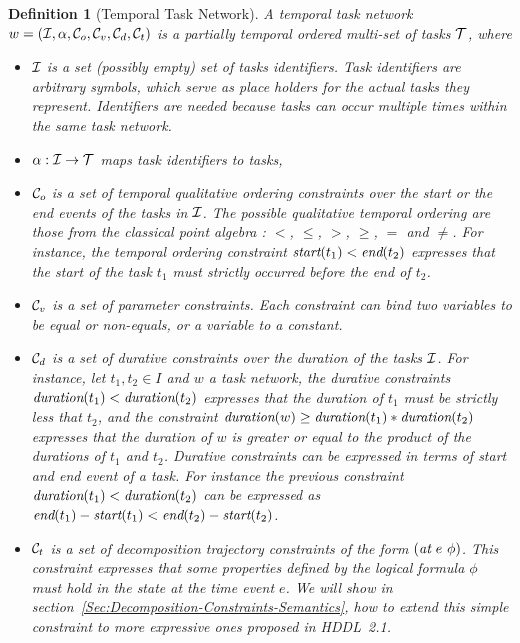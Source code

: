 \documentclass[letterpaper]{article} %
\newtheorem{definition}{Definition}
\newcommand{\at}{\text{\it at}}
\newcommand{\duration}{\text{\it duration}}
\newcommand{\tstart}{\text{\it start}}
\newcommand{\tend}{\text{\it end}}
\begin{document}
 

\begin{definition}[Temporal Task Network]
A temporal task network $w = ({\cal{I}}, \alpha, {\cal{C}}_o, {\cal{C}}_v, {\cal{C}}_d, {\cal{C}}_t)$ is a partially temporal ordered multi-set of tasks $\cal{T}$, where
\begin{itemize}
    
    \item $\cal{I}$ is a set (possibly empty) set of tasks identifiers. Task identifiers are arbitrary symbols, which serve as place holders for the actual tasks they represent. Identifiers are needed because tasks can occur multiple times within the same task network.
    
    \item $\alpha: {\cal{I}} \rightarrow {\cal{T}}$ maps task identifiers to tasks,
    
    \item ${\cal{C}}_o$ is a set of temporal qualitative ordering constraints over the start or the end events of the tasks in $\cal{I}$. The possible qualitative temporal ordering are those from the classical point algebra \cite{broxvall03}: $<$, $\leq$, $>$, $\geq$, $=$ and $\neq$. For instance, the temporal ordering constraint $\tstart(t_1) < \tend(t_2)$ expresses that the start of the task $t_1$ must strictly occurred before the end of $t_2$. 
    
    \item ${\cal{C}}_v$ is a set of parameter constraints. Each constraint can bind two variables to be equal or non-equals, or a variable to a constant. %
    
    \item ${\cal{C}}_d$ is a set of durative constraints over the duration of the tasks $\cal{I}$. For instance, let $t_1, t_2 \in I$ and $w$ a task network, the durative constraints $\duration(t_1) < \duration(t_2)$ expresses that the duration of $t_1$ must be strictly less that $t_2$, and the constraint $\duration(w) \geq \duration(t_1) * \duration(t_2)$ expresses that the duration of $w$ is greater or equal to the product of the durations of $t_1$ and $t_2$. Durative constraints can be expressed in terms of start and end event of a task. For instance the previous constraint $\duration(t_1) < \duration(t_2)$ can be expressed as  $\tend(t_1) - \tstart(t_1) < \tend(t_2) - \tstart(t_2)$.
    
    \item ${\cal{C}}_t$ is a set of decomposition trajectory constraints of the form $(\at \ e \ \phi)$. This constraint expresses that some properties defined by the logical formula $\phi$ must hold in the state at the time event $e$. We will show in section~\ref{Sec:Decomposition-Constraints-Semantics}, how to extend this simple constraint to more expressive ones proposed in HDDL~2.1.
   \end{itemize}
\end{definition}
\end{document}
